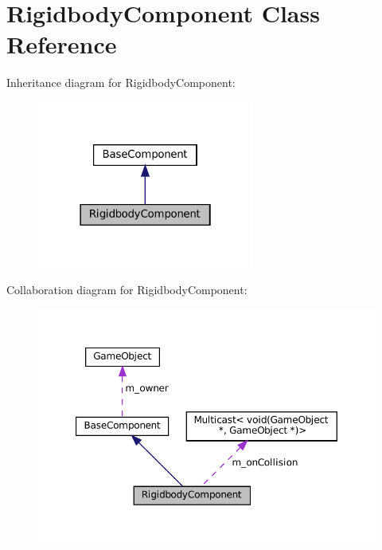 \hypertarget{classRigidbodyComponent}{}\section{Rigidbody\+Component Class Reference}
\label{classRigidbodyComponent}


Inheritance diagram for Rigidbody\+Component\+:\nopagebreak
\begin{figure}[H]
\begin{center}
\leavevmode
\includegraphics[width=202pt]{classRigidbodyComponent__inherit__graph}
\end{center}
\end{figure}


Collaboration diagram for Rigidbody\+Component\+:\nopagebreak
\begin{figure}[H]
\begin{center}
\leavevmode
\includegraphics[width=350pt]{classRigidbodyComponent__coll__graph}
\end{center}
\end{figure}
